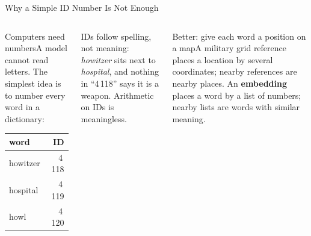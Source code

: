 \documentclass[aspectratio=169,10pt]{beamer}
\begin{document}
\begin{frame}{Why a Simple ID Number Is Not Enough}
\begin{columns}[T]
\begin{cbox}{Computers need numbers}\scriptsize A model cannot read letters. The simplest idea is to number every word in a dictionary:
\begin{center}\renewcommand{\arraystretch}{1.1}
\begin{tabular}{lr}
\toprule\textbf{word}&\textbf{ID}\\\midrule
howitzer&4\,118\\hospital&4\,119\\howl&4\,120\\\bottomrule
\end{tabular}\end{center}
\end{cbox}
\begin{wbox}\scriptsize IDs follow spelling, not meaning: \emph{howitzer} sits next to \emph{hospital}, and nothing in ``4\,118'' says it is a weapon. Arithmetic on IDs is meaningless.\end{wbox}
\begin{cbox}{Better: give each word a position on a map}\scriptsize A military grid reference places a location by several coordinates; nearby references are nearby places. An \textbf{embedding} places a word by a list of numbers; nearby lists are words with similar meaning.\end{cbox}
\end{columns}
\end{frame}
\end{document}
